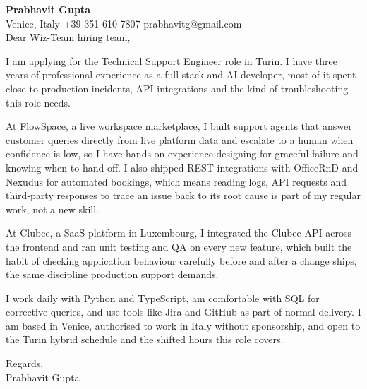 \documentclass[a4paper,10.5pt]{article}
\begin{document}
\textbf{Prabhavit Gupta}\\
Venice, Italy \textbar{} +39 351 610 7807 \textbar{} prabhavitg@gmail.com\\[10pt]
Dear Wiz-Team hiring team,

I am applying for the Technical Support Engineer role in Turin. I have three years of professional experience as a full-stack and AI developer, most of it spent close to production incidents, API integrations and the kind of troubleshooting this role needs.

At FlowSpace, a live workspace marketplace, I built support agents that answer customer queries directly from live platform data and escalate to a human when confidence is low, so I have hands on experience designing for graceful failure and knowing when to hand off. I also shipped REST integrations with OfficeRnD and Nexudus for automated bookings, which means reading logs, API requests and third-party responses to trace an issue back to its root cause is part of my regular work, not a new skill.

At Clubee, a SaaS platform in Luxembourg, I integrated the Clubee API across the frontend and ran unit testing and QA on every new feature, which built the habit of checking application behaviour carefully before and after a change ships, the same discipline production support demands.

I work daily with Python and TypeScript, am comfortable with SQL for corrective queries, and use tools like Jira and GitHub as part of normal delivery. I am based in Venice, authorised to work in Italy without sponsorship, and open to the Turin hybrid schedule and the shifted hours this role covers.

Regards,\\
Prabhavit Gupta
\end{document}
